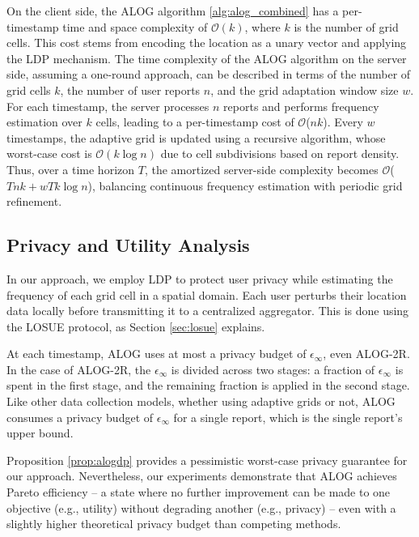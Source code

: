 On the client side, the ALOG algorithm \ref{alg:alog_combined} has a per-timestamp time and space complexity of $\mathcal{O}(k)$, where $k$ is the number of grid cells. This cost stems from encoding the location as a unary vector and applying the LDP mechanism. The time complexity of the ALOG algorithm on the server side, assuming a one-round approach, can be described in terms of the number of grid cells $k$, the number of user reports $n$, and the grid adaptation window size $w$. For each timestamp, the server processes $n$ reports and performs frequency estimation over $k$ cells, leading to a per-timestamp cost of $\mathcal{O}$($nk$). Every $w$ timestamps, the adaptive grid is updated using a recursive algorithm, whose worst-case cost is $\mathcal{O}(k \log n)$ due to cell subdivisions based on report density. Thus, over a time horizon $T$, the amortized server-side complexity becomes 
$\mathcal{O}$($Tnk + wTk\log n$), balancing continuous frequency estimation with periodic grid refinement.

\subsection{Privacy and Utility Analysis}
\label{sec:privacy}

In our approach, we employ LDP to protect user privacy while estimating the frequency of each grid cell in a spatial domain. Each user perturbs their location data locally before transmitting it to a centralized aggregator. This is done using the LOSUE protocol, as Section \ref{sec:losue} explains.

At each timestamp, ALOG uses at most a privacy budget of $\epsilon_\infty$, even ALOG-2R. In the case of ALOG-2R, the $\epsilon_\infty$ is divided across two stages: a fraction of $\epsilon_\infty$ is spent in the first stage, and the remaining fraction is applied in the second stage. Like other data collection models, whether using adaptive grids or not, ALOG consumes a privacy budget of $\epsilon_\infty$ for a single report, which is the single report's upper bound. 

Proposition \ref{prop:alogdp} provides a pessimistic worst-case privacy guarantee for our approach. Nevertheless, our experiments demonstrate that ALOG achieves Pareto efficiency -- a state where no further improvement can be made to one objective (e.g., utility) without degrading another (e.g., privacy) -- even with a slightly higher theoretical privacy budget than competing methods.
\newcommand{\budget}{\eta \epsilon_\infty}

